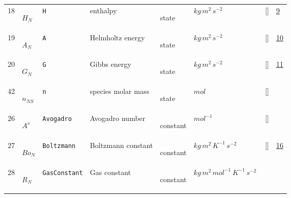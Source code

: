 \begin{longtable}{|p{1cm}|p{3cm}|p{3cm}|p{7cm}|p{3.0cm}|p{3cm}|p{2cm}|p{1cm}|}
    18
             & \hypertarget{"v:18"}{ $ {H}{_{N}} $}
             & \verb|H|
             & enthalpy
             & \begin{lay}state \end{lay}
             & $ kg \,m^{2} \,s^{-2} \, $
             & []
             & \hyperlink{"e:9"}{ 9 }
                 \\
    19
             & \hypertarget{"v:19"}{ $ {A}{_{N}} $}
             & \verb|A|
             & Helmholtz energy
             & \begin{lay}state \end{lay}
             & $ kg \,m^{2} \,s^{-2} \, $
             & []
             & \hyperlink{"e:10"}{ 10 }
                 \\
    20
             & \hypertarget{"v:20"}{ $ {G}{_{N}} $}
             & \verb|G|
             & Gibbs energy
             & \begin{lay}state \end{lay}
             & $ kg \,m^{2} \,s^{-2} \, $
             & []
             & \hyperlink{"e:11"}{ 11 }
                 \\
    42
             & \hypertarget{"v:42"}{ $ {n}{_{{N S}}} $}
             & \verb|n|
             & species molar mass
             & \begin{lay}state \end{lay}
             & $ mol \, $
             & []
             & \\
    26
             & \hypertarget{"v:26"}{ $ {A^v}{_{}} $}
             & \verb|Avogadro|
             & Avogadro number
             & \begin{lay}constant \end{lay}
             & $ mol^{-1} \, $
             & []
             & \\
    27
             & \hypertarget{"v:27"}{ $ {Bo}{_{N}} $}
             & \verb|Boltzmann|
             & Boltzmann constant
             & \begin{lay}constant \end{lay}
             & $ kg \,m^{2} \,K^{-1} \,s^{-2} \, $
             & []
             & \hyperlink{"e:16"}{ 16 }
                 \\
    28
             & \hypertarget{"v:28"}{ $ {R}{_{N}} $}
             & \verb|GasConstant|
             & Gas constant
             & \begin{lay}constant \end{lay}
             & $ kg \,m^{2} \,mol^{-1} \,K^{-1} \,s^{-2} \, $

\end{longtable}
